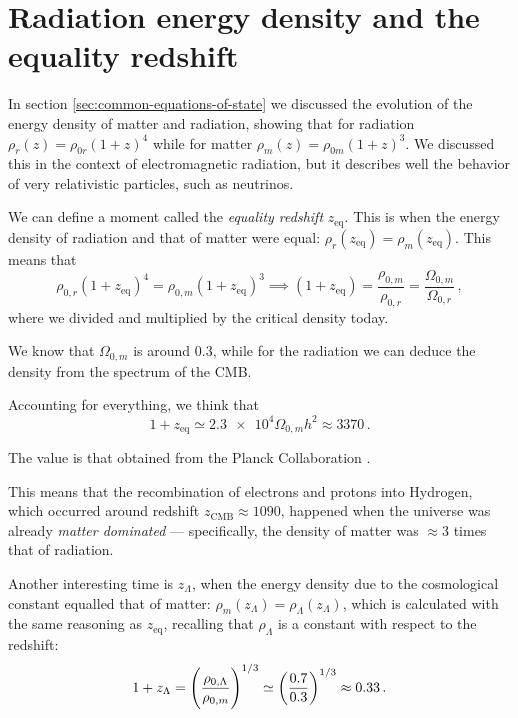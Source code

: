 \documentclass[main.tex]{subfiles}
\begin{document}
\section{Radiation energy density and the equality redshift}

In section \ref{sec:common-equations-of-state} we discussed the evolution of the energy density of matter and radiation, showing that for radiation \(\rho _r (z ) = \rho _{0r} (1+z)^{4}\) while for matter
\(\rho _m (z) = \rho_{0m} (1+z)^{3}\). 
We discussed this in the context of electromagnetic radiation, but it describes well the behavior of very relativistic particles, such as neutrinos. 

We can define a moment called the \emph{equality redshift} \(z _{\text{eq}}\).
This is when the energy density of radiation and that of matter were equal: \(\rho _r (z _{\text{eq}}) = \rho _m (z _{\text{eq}})\).
This means that 
%
\begin{equation}
\rho_{0,r} (1+z _{\text{eq}})^{4} = \rho_{0,m} (1+z _{\text{eq}})^{3} \implies
(1+z _{\text{eq}}) = \frac{\rho _{0,m}}{\rho _{0,r}} 
  = \frac{\Omega_{0,m}}{\Omega_{0,r}}
\,,
\end{equation}
%
where we divided and multiplied by the critical density today. 

We know that \(\Omega_{0,m}\) is around \num{0.3}, while for the radiation we can deduce the density from the spectrum of the CMB.

Accounting for everything, we think that 
%
\begin{equation}
  1 + z _{\text{eq}} \simeq \num{2.3e4} \Omega_{0, m} h^2
  \approx 3370
\,.
\end{equation}

The value is that obtained from the Planck Collaboration \cite[]{PlanckCollaboration:2016XIII}.

This means that the recombination of electrons and protons into Hydrogen, which occurred around redshift \(z _{\text{CMB}} \approx 1090\), happened when the universe was already \emph{matter dominated} --- specifically, the density of matter was \(\approx 3\) times that of radiation.

Another interesting time is \(z_\Lambda \), when the energy density due to the cosmological constant equalled that of matter:  \(\rho _m (z_{\Lambda }) = \rho _\Lambda (z_\Lambda )\), which is calculated with the same reasoning as \(z _{\text{eq}}\), recalling that \(\rho_{\Lambda }\) is a constant with respect to the redshift:
\begin{equation}
1+ z_\Lambda = \qty(\frac{\rho_{0, \Lambda }}{\rho_{0,m}})^{1/3} \simeq \qty(\frac{0.7}{0.3})^{1/3} \approx \num{0.33}
\,.
\end{equation}
\end{document}
